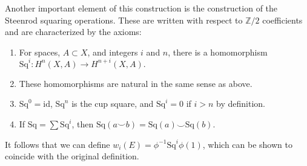 \documentclass[12pt]{book}
\theoremstyle{definition}
\theoremstyle{remark}
\newcommand{\BZ}{\mathbb Z}
\newcommand{\Sq}{\mathrm{Sq}}
\newcommand{\id}{\mathrm{id}}
\newcommand{\s}{\subset}
\begin{document}
Another important element of this construction is the construction of the Steenrod squaring operations. These are written with respect to $\BZ/2$ coefficients and are characterized by the axioms:
\begin{enumerate}
\item For spaces, $A \s X$, and integers $i$ and $n$, there is a homomorphism $\Sq^{i} : H^{n}(X,A) \to H^{n + i}(X,A).$
\item These homomorphisms are natural in the same sense as above.
\item $\Sq^{0} = \id$, $\Sq^{n}$ is the cup square, and $\Sq^{i} = 0$ if $i > n$ by definition.
\item If $\Sq = \sum \Sq^{i}$, then $\Sq(a \smile b) = \Sq(a) \smile \Sq(b).$
\end{enumerate}
It follows that we can define $w_{i}(E) = \phi^{-1}\Sq^{i}\phi(1)$, which can be shown to coincide with the original definition.
\end{document}
